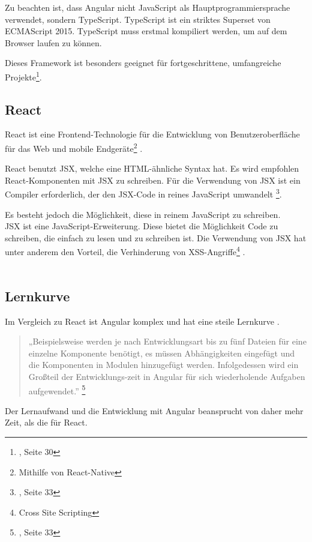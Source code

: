 
Zu beachten ist, dass Angular nicht JavaScript als Hauptprogrammiersprache verwendet, sondern TypeScript.
TypeScript ist ein striktes Superset von ECMAScript 2015.
TypeScript muss erstmal kompiliert werden, um auf dem Browser laufen zu können{\cite{MS1}}. 

Dieses Framework ist besonders geeignet für fortgeschrittene, umfangreiche Projekte\footnote{{\cite{AN1}}, Seite 30}.

\subsection{React}
React ist eine Frontend-Technologie für die Entwicklung von Benutzeroberfläche für das Web und mobile Endgeräte\footnote{Mithilfe von React-Native} \cite{GH08}. 

React benutzt JSX, welche eine HTML-ähnliche Syntax hat.
Es wird empfohlen React-Komponenten mit JSX zu schreiben. 
Für die Verwendung von JSX ist ein Compiler erforderlich, der den JSX-Code in reines JavaScript umwandelt \footnote{{\cite{E01}, Seite 33}}.

Es besteht jedoch die Möglichkeit, diese in reinem JavaScript zu schreiben\cite{JSX1}.
\\
JSX ist eine JavaScript-Erweiterung.
Diese bietet die Möglichkeit Code zu schreiben, die einfach zu lesen und zu schreiben ist. 
Die Verwendung von JSX hat unter anderem den Vorteil, die Verhinderung von XSS-Angriffe\footnote{Cross Site Scripting{\cite{OWASP}}} \cite{JSX1}.
\\\\


\subsection{Lernkurve}
Im Vergleich zu React ist Angular komplex und hat eine steile Lernkurve {\cite{E01}}. 
\begin{quote}
  „Beispielsweise werden je nach Entwicklungsart bis zu fünf Dateien für eine einzelne Komponente benötigt, es müssen Abhängigkeiten eingefügt und die Komponenten in Modulen hinzugefügt werden. Infolgedessen wird ein Großteil der Entwicklungs-zeit in Angular für sich wiederholende Aufgaben aufgewendet.”
  \footnote{{\cite{AN1}, Seite 33}}
\end{quote}
Der Lernaufwand und die Entwicklung mit Angular beansprucht von daher mehr Zeit, als die für React.

